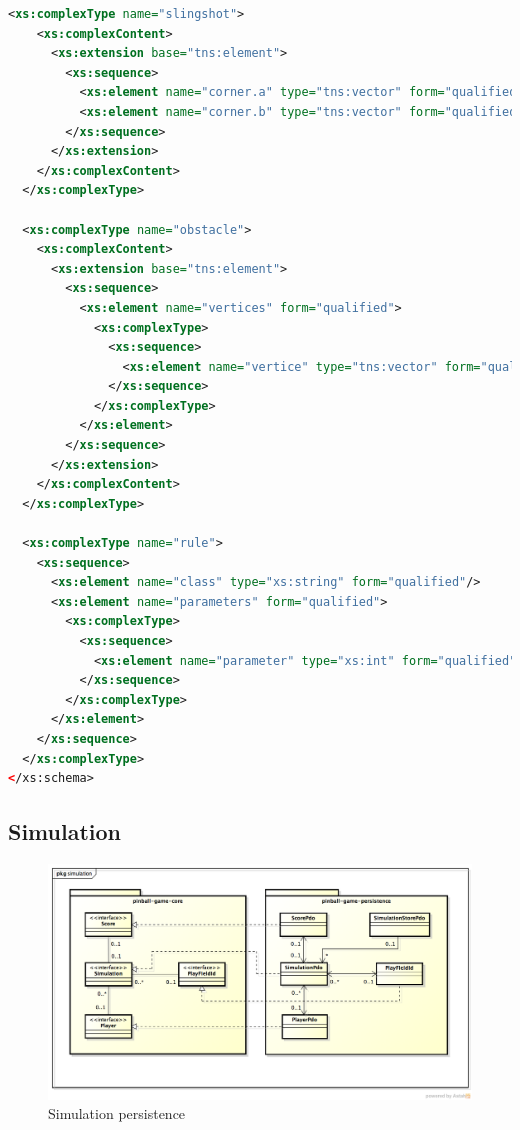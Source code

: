 \documentclass[fontsize=12pt,
               paper=a4,
               twoside=false,
               parskip=half,
               ]{scrartcl}
\begin{document}
\begin{lstlisting}[language=xml,label=lst:playfield_xsd,caption={playfield.xsd}]
  <xs:complexType name="slingshot">
    <xs:complexContent>
      <xs:extension base="tns:element">
        <xs:sequence>
          <xs:element name="corner.a" type="tns:vector" form="qualified"/>
          <xs:element name="corner.b" type="tns:vector" form="qualified"/>
        </xs:sequence>
      </xs:extension>
    </xs:complexContent>
  </xs:complexType>

  <xs:complexType name="obstacle">
    <xs:complexContent>
      <xs:extension base="tns:element">
        <xs:sequence>
          <xs:element name="vertices" form="qualified">
            <xs:complexType>
              <xs:sequence>
                <xs:element name="vertice" type="tns:vector" form="qualified" maxOccurs="unbounded"/>
              </xs:sequence>
            </xs:complexType>
          </xs:element>
        </xs:sequence>
      </xs:extension>
    </xs:complexContent>
  </xs:complexType>

  <xs:complexType name="rule">
    <xs:sequence>
      <xs:element name="class" type="xs:string" form="qualified"/>
      <xs:element name="parameters" form="qualified">
        <xs:complexType>
          <xs:sequence>
            <xs:element name="parameter" type="xs:int" form="qualified" maxOccurs="unbounded"/>
          </xs:sequence>
        </xs:complexType>
      </xs:element>
    </xs:sequence>
  </xs:complexType>
</xs:schema>
\end{lstlisting}


\subsection{Simulation}


\begin{figure}[h!]
	\centering
	\includegraphics[width=15.5cm]{./img/persistence-simulation.png}
	\caption[Simulation persistence]{Simulation persistence}
	\label{fig:simulation_persistence}
\end{figure}
\end{document}
